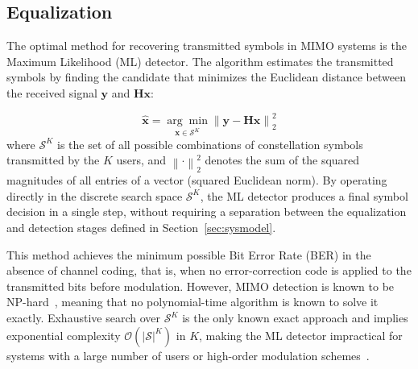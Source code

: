\documentclass[12pt]{article}
\begin{document}


\subsection{Equalization}
\label{sec:equalization}

The optimal method for recovering transmitted symbols in MIMO systems is the
Maximum Likelihood (ML) detector. The algorithm estimates the transmitted
symbols by finding
the candidate that minimizes the Euclidean distance between the received
signal $\mathbf{y}$ and $\mathbf{H}\mathbf{x}$:

\begin{equation}
\hat{\mathbf{x}} = \underset{\mathbf{x} \in \mathcal{S}^{K}}{\arg\min}
\left\|\mathbf{y} - \mathbf{H}\mathbf{x}\right\|_2^2
\label{eq:ml}
\end{equation}
where $\mathcal{S}^{K}$ is the set of all possible combinations of
constellation symbols transmitted by the $K$ users, and
$\left\|\cdot\right\|_2^2$ denotes the sum
of the squared magnitudes of all entries of a vector (squared Euclidean norm). By operating directly in
the discrete search space $\mathcal{S}^{K}$, the ML detector produces a final
symbol decision in a single step, without requiring a separation between the
equalization and detection stages defined in Section~\ref{sec:sysmodel}.

This method achieves the minimum possible Bit Error Rate (BER) in the absence
of channel coding, that is, when no error-correction code is applied to the
transmitted bits before modulation. However, MIMO detection is known to be NP-hard~\cite{zero-forcing},  meaning that no
polynomial-time algorithm is known to solve it exactly.  Exhaustive search over
$\mathcal{S}^{K}$ is the only known exact approach and implies exponential complexity $\mathcal{O}(|\mathcal{S}|^K)$
in $K$, making the ML detector impractical for systems with a large number of
users or high-order modulation schemes~\cite{bello2022algorithms}.
\end{document}
